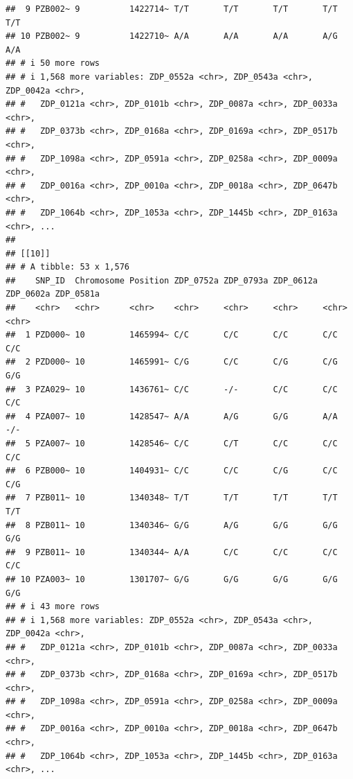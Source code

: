 \documentclass[
]{article}
\begin{document}
\begin{verbatim}
##  9 PZB002~ 9          1422714~ T/T       T/T       T/T       T/T       T/T      
## 10 PZB002~ 9          1422710~ A/A       A/A       A/A       A/G       A/A      
## # i 50 more rows
## # i 1,568 more variables: ZDP_0552a <chr>, ZDP_0543a <chr>, ZDP_0042a <chr>,
## #   ZDP_0121a <chr>, ZDP_0101b <chr>, ZDP_0087a <chr>, ZDP_0033a <chr>,
## #   ZDP_0373b <chr>, ZDP_0168a <chr>, ZDP_0169a <chr>, ZDP_0517b <chr>,
## #   ZDP_1098a <chr>, ZDP_0591a <chr>, ZDP_0258a <chr>, ZDP_0009a <chr>,
## #   ZDP_0016a <chr>, ZDP_0010a <chr>, ZDP_0018a <chr>, ZDP_0647b <chr>,
## #   ZDP_1064b <chr>, ZDP_1053a <chr>, ZDP_1445b <chr>, ZDP_0163a <chr>, ...
## 
## [[10]]
## # A tibble: 53 x 1,576
##    SNP_ID  Chromosome Position ZDP_0752a ZDP_0793a ZDP_0612a ZDP_0602a ZDP_0581a
##    <chr>   <chr>      <chr>    <chr>     <chr>     <chr>     <chr>     <chr>    
##  1 PZD000~ 10         1465994~ C/C       C/C       C/C       C/C       C/C      
##  2 PZD000~ 10         1465991~ C/G       C/C       C/G       C/G       G/G      
##  3 PZA029~ 10         1436761~ C/C       -/-       C/C       C/C       C/C      
##  4 PZA007~ 10         1428547~ A/A       A/G       G/G       A/A       -/-      
##  5 PZA007~ 10         1428546~ C/C       C/T       C/C       C/C       C/C      
##  6 PZB000~ 10         1404931~ C/C       C/C       C/G       C/C       C/G      
##  7 PZB011~ 10         1340348~ T/T       T/T       T/T       T/T       T/T      
##  8 PZB011~ 10         1340346~ G/G       A/G       G/G       G/G       G/G      
##  9 PZB011~ 10         1340344~ A/A       C/C       C/C       C/C       C/C      
## 10 PZA003~ 10         1301707~ G/G       G/G       G/G       G/G       G/G      
## # i 43 more rows
## # i 1,568 more variables: ZDP_0552a <chr>, ZDP_0543a <chr>, ZDP_0042a <chr>,
## #   ZDP_0121a <chr>, ZDP_0101b <chr>, ZDP_0087a <chr>, ZDP_0033a <chr>,
## #   ZDP_0373b <chr>, ZDP_0168a <chr>, ZDP_0169a <chr>, ZDP_0517b <chr>,
## #   ZDP_1098a <chr>, ZDP_0591a <chr>, ZDP_0258a <chr>, ZDP_0009a <chr>,
## #   ZDP_0016a <chr>, ZDP_0010a <chr>, ZDP_0018a <chr>, ZDP_0647b <chr>,
## #   ZDP_1064b <chr>, ZDP_1053a <chr>, ZDP_1445b <chr>, ZDP_0163a <chr>, ...
\end{verbatim}
\end{document}
